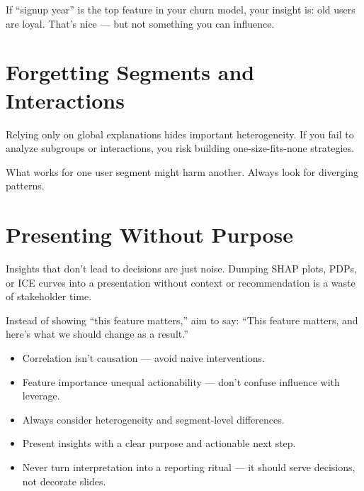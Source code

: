 \documentclass[12pt,openany]{book}
\begin{document}
\begin{examplebox}
If “signup year” is the top feature in your churn model, your insight is: old users are loyal. That’s nice — but not something you can influence.
\end{examplebox}

\section{Forgetting Segments and Interactions}

Relying only on global explanations hides important heterogeneity. If you fail to analyze subgroups or interactions, you risk building one-size-fits-none strategies.

\begin{notebox}
What works for one user segment might harm another. Always look for diverging patterns.
\end{notebox}

\section{Presenting Without Purpose}

Insights that don’t lead to decisions are just noise. Dumping SHAP plots, PDPs, or ICE curves into a presentation without context or recommendation is a waste of stakeholder time.

\begin{examplebox}
Instead of showing “this feature matters,” aim to say: “This feature matters, and here’s what we should change as a result.”
\end{examplebox}

\begin{summarybox}
\begin{itemize}
  \item Correlation isn’t causation — avoid naive interventions.
  \item Feature importance unequal actionability — don’t confuse influence with leverage.
  \item Always consider heterogeneity and segment-level differences.
  \item Present insights with a clear purpose and actionable next step.
  \item Never turn interpretation into a reporting ritual — it should serve decisions, not decorate slides.
\end{itemize}
\end{summarybox}
\end{document}
